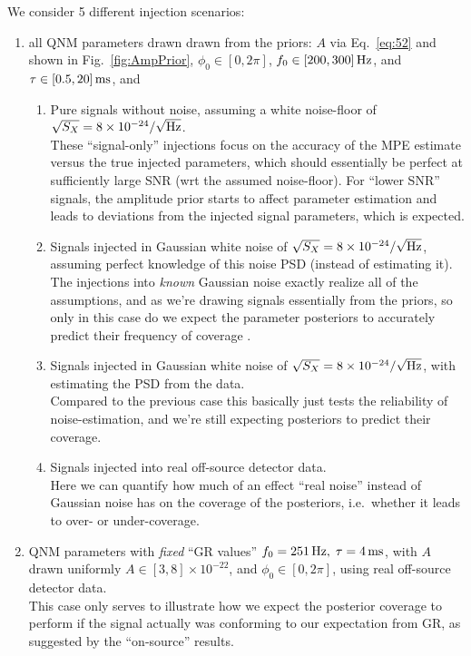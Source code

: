 \documentclass[aps,prd,onecolumn,notitlepage,nofootinbib,superscriptaddress,altaffilletter,floatfix]{revtex4-1}
\begin{document}
We consider 5 different injection scenarios:
\begin{enumerate}

\item all QNM parameters drawn drawn from the priors: $A$ via Eq.~\eqref{eq:52} and shown in Fig.~\ref{fig:AmpPrior}, $\phi_0 \in {[0,2\pi]}$, $f_0
  \in {[200,300]}\,\mathrm{Hz}$, and $\tau \in {[0.5,20]}\,\mathrm{ms}$, and

  \begin{enumerate}
  \item Pure signals without noise, assuming a white noise-floor of $\sqrt{S_X} = 8\times10^{-24}/\sqrt{\mathrm{Hz}}$.\\[0.2cm]
    These ``signal-only'' injections focus on the accuracy of the MPE estimate versus the true injected parameters, which should essentially be
    perfect at sufficiently large SNR (wrt the assumed noise-floor). For ``lower SNR'' signals, the amplitude prior starts to affect parameter estimation
    and leads to deviations from the injected signal parameters, which is expected.

  \item Signals injected in Gaussian white noise of $\sqrt{S_X} = 8\times10^{-24}/\sqrt{\mathrm{Hz}}$, assuming perfect knowledge of this noise PSD (instead
    of estimating it).\\[0.2cm]
    The injections into \emph{known} Gaussian noise exactly realize all of the assumptions, and as we're drawing signals essentially from the
    priors, so only in this case do we expect the parameter posteriors to accurately predict their frequency of coverage \citep[e.g.\ see][]{2008arXiv0804.1161S}.

  \item Signals injected in Gaussian white noise of $\sqrt{S_X} = 8\times10^{-24}/\sqrt{\mathrm{Hz}}$, with estimating the PSD from the data.\\[0.2cm]
    Compared to the previous case this basically just tests the reliability of noise-estimation, and we're still expecting posteriors to predict their
    coverage.

  \item Signals injected into real off-source detector data.\\[0.2cm]
    Here we can quantify how much of an effect ``real noise'' instead of Gaussian noise has on the coverage of the posteriors, i.e.\ whether it leads
    to over- or under-coverage.
  \end{enumerate}

\item QNM parameters with \emph{fixed} ``GR values'' $f_0 = 251\,\mathrm{Hz},\;\tau = 4\,\mathrm{ms}$, with $A$ drawn uniformly $A \in {[3,8]}\times10^{-22}$,
  and $\phi_0 \in {[0,2\pi]}$, using real off-source detector data.\\[0.2cm]
  This case only serves to illustrate how we expect the posterior coverage to perform if the signal actually was conforming to our expectation from
  GR, as suggested by the ``on-source'' results.

\end{enumerate}
\end{document}
